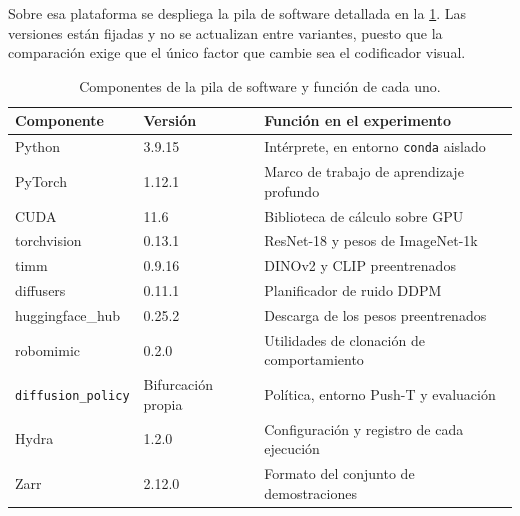Sobre esa plataforma se despliega la pila de software detallada en la
\cref{tab:componentes}. Las versiones est\'an fijadas y no se actualizan entre variantes,
puesto que la comparaci\'on exige que el \'unico factor que cambie sea el codificador
visual.

\begin{table}[htbp]
  \centering
  \caption{Componentes de la pila de software y funci\'on de cada uno.}
  \label{tab:componentes}
  \small
  \begin{tabular}{lll}
    \toprule
    Componente & Versi\'on & Funci\'on en el experimento \\
    \midrule
    Python              & 3.9.15  & Int\'erprete, en entorno \texttt{conda} aislado \\
    PyTorch             & 1.12.1  & Marco de trabajo de aprendizaje profundo
                                    \cite{paszke2019pytorch} \\
    CUDA                & 11.6    & Biblioteca de c\'alculo sobre GPU \\
    torchvision         & 0.13.1  & ResNet-18 y pesos de ImageNet-1k \\
    timm                & 0.9.16  & DINOv2 y CLIP preentrenados \cite{wightman2019timm} \\
    diffusers           & 0.11.1  & Planificador de ruido DDPM \\
    huggingface\_hub    & 0.25.2  & Descarga de los pesos preentrenados \\
    robomimic           & 0.2.0   & Utilidades de clonaci\'on de comportamiento
                                    \cite{mandlekar2021robomimic} \\
    \texttt{diffusion\_policy} & Bifurcaci\'on propia & Pol\'itica, entorno Push-T y
                                    evaluaci\'on \\
    Hydra               & 1.2.0   & Configuraci\'on y registro de cada
                                    ejecuci\'on \\
    Zarr                & 2.12.0  & Formato del conjunto de
                                    demostraciones \\
    \bottomrule
  \end{tabular}
\end{table}

